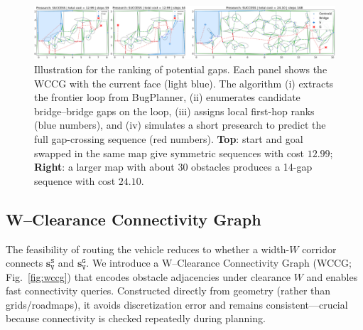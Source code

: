 \begin{figure}[t!]
  \centering
  \includegraphics[width=0.95\linewidth]{figures/presearch.png}%
  \vspace{-0.15in}
\caption{
Illustration for {the ranking of potential gaps.}
Each panel shows the WCCG with the current face (light blue).
The algorithm (i) extracts the frontier loop from BugPlanner,
(ii) enumerates candidate bridge--bridge gaps on the loop,
(iii) assigns local first-hop ranks (blue numbers),
and (iv) simulates a short presearch to predict the full gap-crossing sequence (red numbers).
\textbf{Top}: start and goal swapped in the same map give symmetric
sequences with cost $12.99$;
\textbf{Right}: a larger map with about 30 obstacles produces a 14-gap sequence
with cost $24.10$.
}
  \label{fig:presearch}
   \vspace{-4mm}
\end{figure}
\subsection{W--Clearance Connectivity Graph}\label{subsec:wccg}

The feasibility of routing the vehicle reduces to whether a width-$W$ corridor 
connects $\mathbf{s}_\texttt{V}^{\texttt{S}}$ and $\mathbf{s}_\texttt{V}^{\texttt{G}}$. 
We introduce a W--Clearance Connectivity Graph (WCCG; Fig.~\ref{fig:wccg}) 
that encodes obstacle adjacencies under clearance $W$ and enables fast connectivity queries. 
Constructed directly from geometry (rather than grids/roadmaps), 
it avoids discretization error and remains consistent—crucial because connectivity is checked repeatedly 
during planning.

